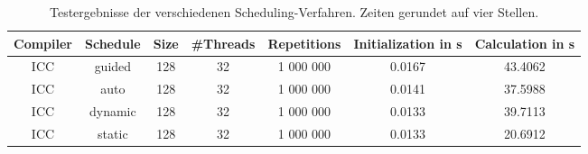 \documentclass[german,plainarticle,hyperref,utf8]{zihpub}
\begin{document}
	\begin{table}
		\begin{center}
			\begin{tabular}{||c c c c c c c||}
				\hline
				Compiler & Schedule & Size & \#Threads & Repetitions & Initialization in s & Calculation in s \\ [1ex]
				\hline\hline
				ICC      & guided   & 128  & 32        & 1 000 000   & 0.0167                   & 43.4062                \\
				\hline
				ICC      & auto     & 128  & 32        & 1 000 000   & 0.0141                   & 37.5988                \\
				\hline
				ICC      & dynamic  & 128  & 32        & 1 000 000   & 0.0133                   & 39.7113                \\
				\hline
				ICC      & static   & 128  & 32        & 1 000 000   & 0.0133                   & 20.6912                \\
				\hline
			\end{tabular}
			\caption{\label{tab:sched}Testergebnisse der verschiedenen Scheduling-Verfahren. Zeiten gerundet auf vier Stellen.}
		\end{center}
	\end{table}
	\clearpage
	
\end{document}
